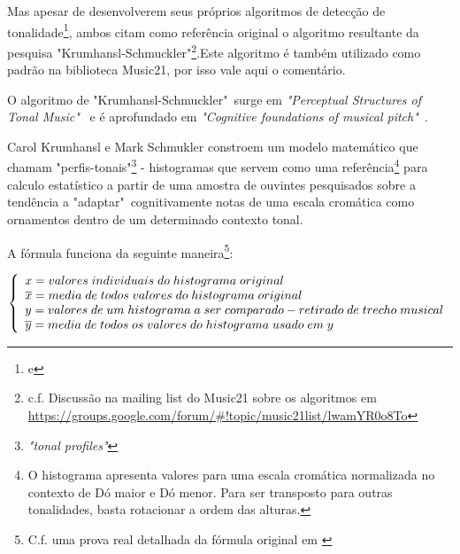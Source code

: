 \documentclass[
	12pt,				%
	openright,			%
	twoside,			%
	a4paper,			%
	english,			%
	french,				%
	spanish,			%
	brazil				%
	]{abntex2}
\begin{document}
Mas apesar de desenvolverem seus próprios algoritmos de detecção de tonalidade\footnote{\cite[p. 173]{temperley2001cognition} e }, ambos citam como referência original o algoritmo resultante da pesquisa "Krumhansl-Schmuckler"\footnote{c.f. Discussão na mailing list do Music21 sobre os algoritmos em \url{https://groups.google.com/forum/\#!topic/music21list/lwamYR0o8To}}.Este algoritmo é também utilizado como padrão na biblioteca Music21, por isso vale aqui o comentário.

O algoritmo de "Krumhansl-Schmuckler"\ surge em \textit{"Perceptual Structures of Tonal Music"}\ \cite{krumhansl1983perceptual} e é aprofundado em \textit{"Cognitive foundations of musical pitch"}\ \cite{krumhansl1990cognitive}.

Carol Krumhansl e Mark Schmukler constroem um modelo matemático que chamam "perfis-tonais"\footnote{\textit{"tonal profiles"}} - histogramas que servem como uma referência\footnote{O histograma apresenta valores para uma escala cromática normalizada no contexto de Dó maior e Dó menor. Para ser transposto para outras tonalidades, basta rotacionar a ordem das alturas.} para calculo estatístico a partir de uma amostra de ouvintes pesquisados sobre a tendência a "adaptar"\ cognitivamente \cite[p.  173]{temperley2001cognition} notas de uma escala cromática como ornamentos dentro de um determinado contexto tonal.

A fórmula funciona da seguinte maneira\footnote{C.f. uma prova real detalhada da fórmula original em \cite[p.37]{krumhansl1990cognitive} }:



$ \left\{
  \begin{array}{l l}
x = valores\;individuais\;do\;histograma\;original \\
\overline{x} = media\;de\;todos\;valores\;do\;histograma\;original \\
y = valores\;de\;um\;histograma\;a\;ser\;comparado - retirado\;de\;trecho\;musical \\
\overline{y} = media\;de\;todos\;os\;valores\;do\;histograma\;usado\;em\;y \\
    
  \end{array} \right.
$
\end{document}

